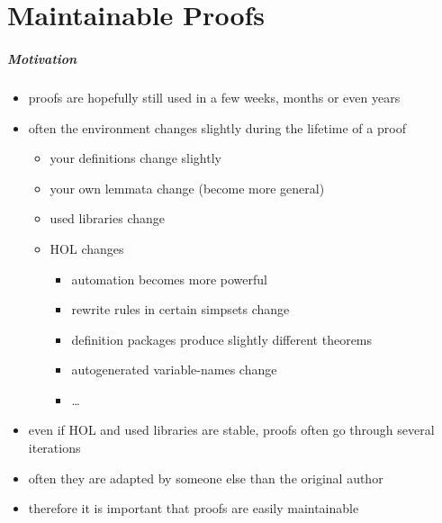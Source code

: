 \part{Maintainable Proofs}

\frame[plain]{\partpage}

\begin{frame}
\frametitle{Motivation}

\begin{itemize}
\item proofs are hopefully still used in a few weeks, months or even years
\item often the environment changes slightly during the lifetime of a proof
\begin{itemize}
\item your definitions change slightly
\item your own lemmata change (\eg become more general)
\item used libraries change
\item HOL changes
\begin{itemize}
\item automation becomes more powerful
\item rewrite rules in certain simpsets change
\item definition packages produce slightly different theorems
\item autogenerated variable-names change
\item \ldots
\end{itemize}
\end{itemize}
\item even if HOL and used libraries are stable, proofs often go through several iterations
\item often they are adapted by someone else than the original author
\item \alert{therefore it is important that proofs are easily maintainable}
\end{itemize}
\end{frame}


